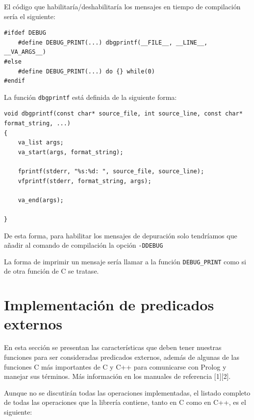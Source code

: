 \documentclass[a4paper]{article}
\begin{document}
El código que habilitaría/deshabilitaría los mensajes en tiempo de compilación sería el siguiente:

\begin{lstlisting}[style=C++]
#ifdef DEBUG
	#define DEBUG_PRINT(...) dbgprintf(__FILE__, __LINE__, __VA_ARGS__)
#else
	#define DEBUG_PRINT(...) do {} while(0)
#endif
\end{lstlisting}

La función \texttt{dbgprintf} está definida de la siguiente forma:

\begin{lstlisting}[style=C++]
void dbgprintf(const char* source_file, int source_line, const char* format_string, ...)
{
    va_list args;
    va_start(args, format_string);

    fprintf(stderr, "%s:%d: ", source_file, source_line);
    vfprintf(stderr, format_string, args);

    va_end(args);

}
\end{lstlisting}

De esta forma, para habilitar los mensajes de depuración solo tendríamos que añadir al comando de compilación la opción \texttt{-DDEBUG}

La forma de imprimir un mensaje sería llamar a la función \texttt{DEBUG_PRINT} como si de otra función de C se tratase.


\section{Implementación de predicados externos}

En esta sección se presentan las características que deben tener nuestras funciones para ser consideradas predicados externos, además de algunas de las funciones C más importantes de C y C++ para comunicarse con Prolog y manejar sus términos. Más información en los manuales de referencia [1][2].

Aunque no se discutirán todas las operaciones implementadas, el listado completo de todas las operaciones que la librería contiene, tanto en C como en C++, es el siguiente:
\end{document}
